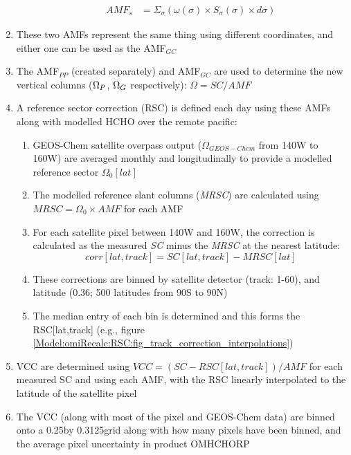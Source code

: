 \begin{enumerate}
\begin{enumerate}
\begin{align}
          AMF_s &= \Sigma_{\sigma} \left(\omega(\sigma) \times S_{\sigma}(\sigma) \times d\sigma \right)
        \end{align}
      \end{enumerate}
      \item These two AMFs represent the same thing using different coordinates, and either one can be used as the AMF$_{GC}$
      \item The AMF$_{PP}$ (created separately) and AMF$_{GC}$ are used to determine the new vertical columns ($\Omega_{P}$, $\Omega_{G}$ respectively): $\Omega = SC/AMF$
      \item A reference sector correction (RSC) is defined each day using these AMFs along with modelled HCHO over the remote pacific:
      \begin{enumerate}
        \item GEOS-Chem satellite overpass output ($\Omega_{GEOS-Chem}$ from 140{\degr}W to 160{\degr}W) are averaged monthly and longitudinally to provide a modelled reference sector $\Omega_0[lat]$
        \item The modelled reference slant columns (\textit{MRSC}) are calculated using $MRSC = \Omega_0 \times AMF$ for each AMF
        \item For each satellite pixel between 140{\degr}W and 160{\degr}W, the correction is calculated as the measured \textit{SC} minus the \textit{MRSC} at the nearest latitude:
        \begin{equation*}
          corr[lat,track] = SC[lat,track] - MRSC[lat]
        \end{equation*}
        \item These corrections are binned by satellite detector (track: 1-60), and latitude (0.36\degr; 500 latitudes from 90{\degr}S to 90{\degr}N)
        \item The median entry of each bin is determined and this forms the RSC[lat,track] (e.g., figure \ref{Model:omiRecalc:RSC:fig_track_correction_interpolations})
      \end{enumerate}
      \item VCC are determined using $VCC = (SC - RSC[lat,track] )/AMF$ for each measured SC and using each AMF, with the RSC linearly interpolated to the latitude of the satellite pixel
      \item The VCC (along with most of the pixel and GEOS-Chem data) are binned onto a 0.25\degr by 0.3125\degr grid along with how many pixels have been binned, and the average pixel uncertainty in product OMHCHORP
    \end{enumerate}
 
